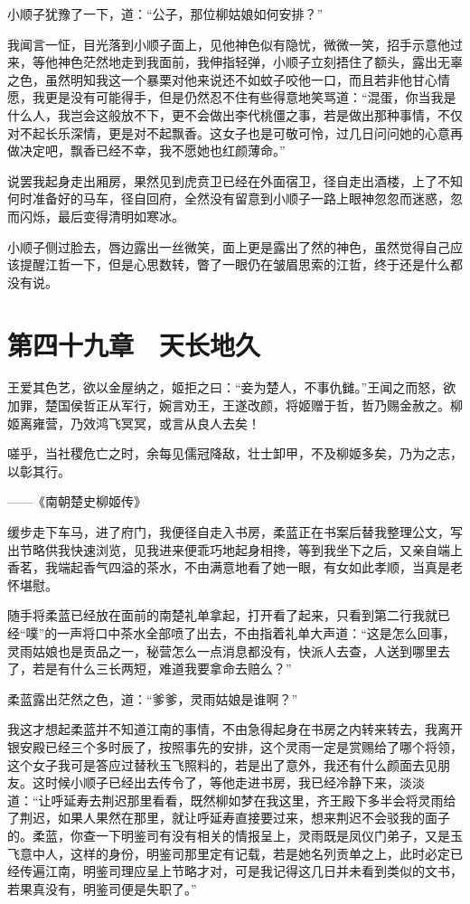 小顺子犹豫了一下，道：“公子，那位柳姑娘如何安排？”

我闻言一怔，目光落到小顺子面上，见他神色似有隐忧，微微一笑，招手示意他过来，等他神色茫然地走到我面前，我伸指轻弹，小顺子立刻捂住了额头，露出无辜之色，虽然明知我这一个暴栗对他来说还不如蚊子咬他一口，而且若非他甘心情愿，我更是没有可能得手，但是仍然忍不住有些得意地笑骂道：“混蛋，你当我是什么人，我岂会这般放不下，更不会做出李代桃僵之事，若是做出那种事情，不仅对不起长乐深情，更是对不起飘香。这女子也是可敬可怜，过几日问问她的心意再做决定吧，飘香已经不幸，我不愿她也红颜薄命。”

说罢我起身走出厢房，果然见到虎贲卫已经在外面宿卫，径自走出酒楼，上了不知何时准备好的马车，径自回府，全然没有留意到小顺子一路上眼神忽忽而迷惑，忽而闪烁，最后变得清明如寒冰。

小顺子侧过脸去，唇边露出一丝微笑，面上更是露出了然的神色，虽然觉得自己应该提醒江哲一下，但是心思数转，瞥了一眼仍在皱眉思索的江哲，终于还是什么都没有说。

\chapter{第四十九章　天长地久}

王爱其色艺，欲以金屋纳之，姬拒之曰：“妾为楚人，不事仇雠。”王闻之而怒，欲加罪，楚国侯哲正从军行，婉言劝王，王遂改颜，将姬赠于哲，哲乃赐金赦之。柳姬离雍营，乃效鸿飞冥冥，或言从良人去矣！

嗟乎，当社稷危亡之时，余每见儒冠降敌，壮士卸甲，不及柳姬多矣，乃为之志，以彰其行。

——《南朝楚史柳姬传》

缓步走下车马，进了府门，我便径自走入书房，柔蓝正在书案后替我整理公文，写出节略供我快速浏览，见我进来便乖巧地起身相搀，等到我坐下之后，又亲自端上香茗，我端起香气四溢的茶水，不由满意地看了她一眼，有女如此孝顺，当真是老怀堪慰。

随手将柔蓝已经放在面前的南楚礼单拿起，打开看了起来，只看到第二行我就已经“噗”的一声将口中茶水全部喷了出去，不由指着礼单大声道：“这是怎么回事，灵雨姑娘也是贡品之一，秘营怎么一点消息都没有，快派人去查，人送到哪里去了，若是有什么三长两短，难道我要拿命去赔么？”

柔蓝露出茫然之色，道：“爹爹，灵雨姑娘是谁啊？”

我这才想起柔蓝并不知道江南的事情，不由急得起身在书房之内转来转去，我离开银安殿已经三个多时辰了，按照事先的安排，这个灵雨一定是赏赐给了哪个将领，这个女子我可是答应过替秋玉飞照料的，若是出了意外，我还有什么颜面去见朋友。这时候小顺子已经出去传令了，等他走进书房，我已经冷静下来，淡淡道：“让呼延寿去荆迟那里看看，既然柳如梦在我这里，齐王殿下多半会将灵雨给了荆迟，如果人果然在那里，就让呼延寿直接要过来，想来荆迟不会驳我的面子的。柔蓝，你查一下明鉴司有没有相关的情报呈上，灵雨既是凤仪门弟子，又是玉飞意中人，这样的身份，明鉴司那里定有记载，若是她名列贡单之上，此时必定已经传遍江南，明鉴司理应呈上节略才对，可是我记得这几日并未看到类似的文书，若果真没有，明鉴司便是失职了。”

